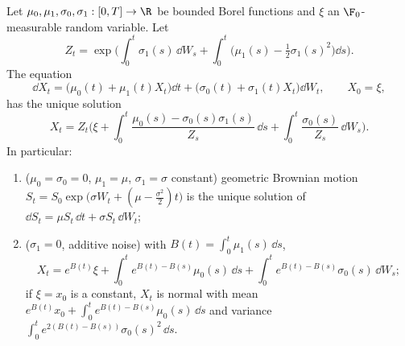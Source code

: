 \begin{proposition}\label{prop:sde-linear}
Let $\mu_0,\mu_1,\sigma_0,\sigma_1:[0,T]\to\R$ be bounded Borel functions and $\xi$ an
$\F_0$-measurable random variable. Let
\[
  Z_t=\exp\Big(\int_0^t\sigma_1(s)\,\dd W_s+\int_0^t\big(\mu_1(s)-\tfrac12\sigma_1(s)^2\big)\dd s\Big).
\]
The equation
\begin{equation}\label{eq:sde-linear}
  \dd X_t=\big(\mu_0(t)+\mu_1(t)X_t\big)\dd t+\big(\sigma_0(t)+\sigma_1(t)X_t\big)\dd W_t,
  \qquad X_0=\xi,
\end{equation}
has the unique solution
\begin{equation}\label{eq:sde-linear-solution}
  X_t=Z_t\Big(\xi+\int_0^t\frac{\mu_0(s)-\sigma_0(s)\sigma_1(s)}{Z_s}\,\dd s
  +\int_0^t\frac{\sigma_0(s)}{Z_s}\,\dd W_s\Big).
\end{equation}
In particular:
\begin{enumerate}[label=(\alph*)]
  \item ($\mu_0=\sigma_0=0$, $\mu_1=\mu$, $\sigma_1=\sigma$ constant) geometric Brownian
    motion $S_t=S_0\exp\big(\sigma W_t+(\mu-\frac{\sigma^2}2)t\big)$ is the unique solution of
    $\dd S_t=\mu S_t\,\dd t+\sigma S_t\,\dd W_t$;
  \item ($\sigma_1=0$, additive noise) with $B(t)=\int_0^t\mu_1(s)\,\dd s$,
    \[
      X_t=e^{B(t)}\xi+\int_0^te^{B(t)-B(s)}\mu_0(s)\,\dd s+\int_0^te^{B(t)-B(s)}\sigma_0(s)\,\dd W_s ;
    \]
    if $\xi=x_0$ is a constant, $X_t$ is normal with mean
    $e^{B(t)}x_0+\int_0^te^{B(t)-B(s)}\mu_0(s)\,\dd s$ and variance
    $\int_0^te^{2(B(t)-B(s))}\sigma_0(s)^2\,\dd s$.
\end{enumerate}
\end{proposition}

